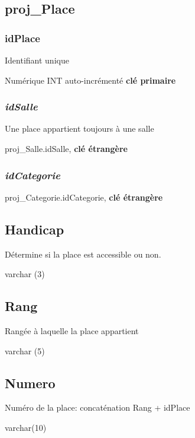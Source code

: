 \subsection{proj\_Place}\label{projux5fplace}

\subsubsection{\texorpdfstring{\textbf{idPlace}}{idPlace}}\label{idplace}

Identifiant unique

Numérique INT auto-incrémenté \textbf{clé primaire}

\subsubsection{\texorpdfstring{\emph{idSalle}}{idSalle}}\label{idsalle-3}

Une place appartient toujours à une salle

proj\_Salle.idSalle, \textbf{clé étrangère}

\subsubsection{\texorpdfstring{\emph{idCategorie}}{idCategorie}}\label{idcategorie-1}

proj\_Categorie.idCategorie, \textbf{clé étrangère}

\subsection{Handicap}\label{handicap}

Détermine si la place est accessible ou non.

varchar (3)

\subsection{Rang}\label{rang}

Rangée à laquelle la place appartient

varchar (5)

\subsection{Numero}\label{numero}

Numéro de la place: concaténation Rang + idPlace

varchar(10)


